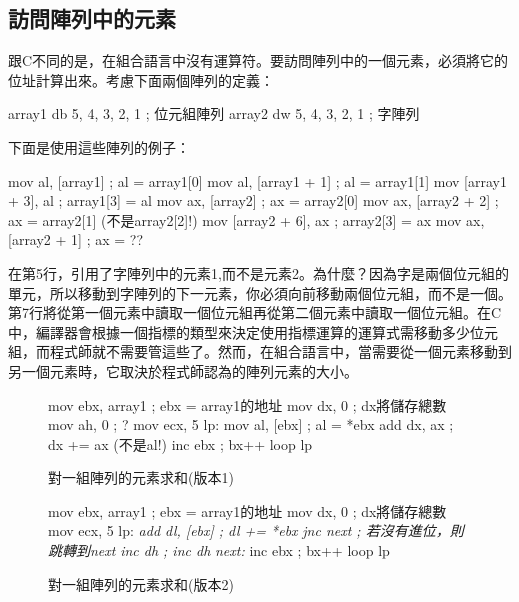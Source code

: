 \subsection{訪問陣列中的元素}

跟C不同的是，在組合語言中沒有{\code [ ]}運算符。要訪問陣列中的一個元素，必須將它的位址計算出來。考慮下面兩個陣列的定義：
\begin{AsmCodeListing}[frame=none, numbers=none]
array1       db     5, 4, 3, 2, 1     ; 位元組陣列
array2       dw     5, 4, 3, 2, 1     ; 字陣列
\end{AsmCodeListing}
下面是使用這些陣列的例子：
\begin{AsmCodeListing}[frame=none]
      mov    al, [array1]             ; al = array1[0]
      mov    al, [array1 + 1]         ; al = array1[1]
      mov    [array1 + 3], al         ; array1[3] = al
      mov    ax, [array2]             ; ax = array2[0]
      mov    ax, [array2 + 2]         ; ax = array2[1] (不是array2[2]!)
      mov    [array2 + 6], ax         ; array2[3] = ax
      mov    ax, [array2 + 1]         ; ax = ??
\end{AsmCodeListing}
在第5行，引用了字陣列中的元素1,而不是元素2。為什麼？因為字是兩個位元組的單元，所以移動到字陣列的下一元素，你必須向前移動兩個位元組，而不是一個。第7行將從第一個元素中讀取一個位元組再從第二個元素中讀取一個位元組。在C中，編譯器會根據一個指標的類型來決定使用指標運算的運算式需移動多少位元組，而程式師就不需要管這些了。然而，在組合語言中，當需要從一個元素移動到另一個元素時，它取決於程式師認為的陣列元素的大小。

\begin{figure}[t]
\begin{AsmCodeListing}[frame=single,commandchars=\\\{\}]
      mov    ebx, array1           ; ebx = array1的地址
      mov    dx, 0                 ; dx將儲存總數
      mov    ah, 0                 ; ?
      mov    ecx, 5
lp:
      mov    al, [ebx]             ; al = *ebx
      add    dx, ax                ; dx += ax (不是al!) \label{line:SumArray1}
      inc    ebx                   ; bx++
      loop   lp
\end{AsmCodeListing}
\caption{對一組陣列的元素求和(版本1)\label{fig:SumArray1}}
\end{figure}

\begin{figure}[t]
\begin{AsmCodeListing}[frame=single,commandchars=\\\{\}]
      mov    ebx, array1           ; ebx = array1的地址
      mov    dx, 0                 ; dx將儲存總數
      mov    ecx, 5
lp:
\textit{      add    dl, [ebx]             ; dl += *ebx}
\textit{      jnc    next                  ; 若沒有進位，則跳轉到next}
\textit{      inc    dh                    ; inc dh}
\textit{next:}
      inc    ebx                   ; bx++
      loop   lp
\end{AsmCodeListing}
\caption{對一組陣列的元素求和(版本2)\label{fig:SumArray2}}
\end{figure}

